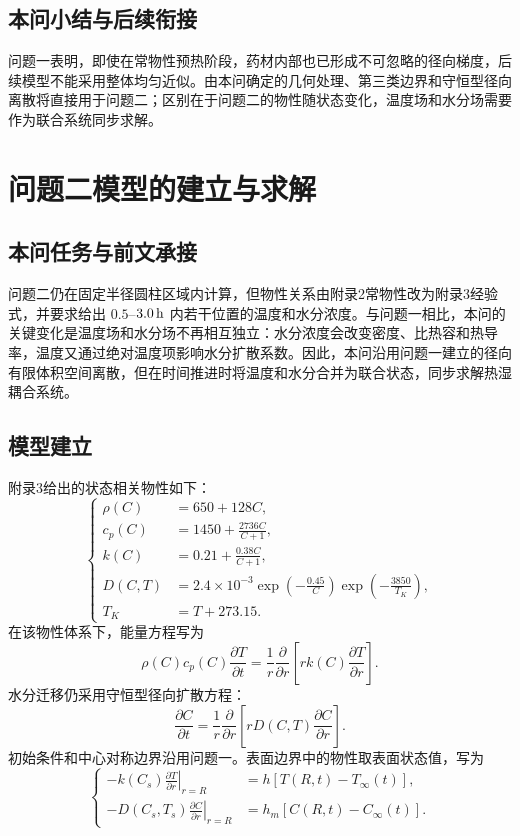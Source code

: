 \documentclass[UTF8,a4paper,12pt]{ctexart}
\begin{document}
\subsection{本问小结与后续衔接}
问题一表明，即使在常物性预热阶段，药材内部也已形成不可忽略的径向梯度，后续模型不能采用整体均匀近似。由本问确定的几何处理、第三类边界和守恒型径向离散将直接用于问题二；区别在于问题二的物性随状态变化，温度场和水分场需要作为联合系统同步求解。

\section{问题二模型的建立与求解}
\subsection{本问任务与前文承接}
问题二仍在固定半径圆柱区域内计算，但物性关系由附录2常物性改为附录3经验式，并要求给出 $0.5$--$3.0\rm\,h$ 内若干位置的温度和水分浓度。与问题一相比，本问的关键变化是温度场和水分场不再相互独立：水分浓度会改变密度、比热容和热导率，温度又通过绝对温度项影响水分扩散系数。因此，本问沿用问题一建立的径向有限体积空间离散，但在时间推进时将温度和水分合并为联合状态，同步求解热湿耦合系统。

\subsection{模型建立}
附录3给出的状态相关物性如下：
\begin{equation}
\left\{
\begin{aligned}
\rho(C)&=650+128C,\\
c_p(C)&=1450+\frac{2736C}{C+1},\\
k(C)&=0.21+\frac{0.38C}{C+1},\\
D(C,T)&=2.4\times10^{-3}
\exp\left(-\frac{0.45}{C}\right)
\exp\left(-\frac{3850}{T_K}\right),\\
T_K&=T+273.15.
\end{aligned}
\right.
\end{equation}
\setcounter{equation}{18}
在该物性体系下，能量方程写为
\begin{equation}
  \rho(C)c_p(C)\frac{\partial T}{\partial t}
  =\frac1r\frac{\partial}{\partial r}
  \left[rk(C)\frac{\partial T}{\partial r}\right].
\end{equation}
水分迁移仍采用守恒型径向扩散方程：
\begin{equation}
  \frac{\partial C}{\partial t}
  =\frac1r\frac{\partial}{\partial r}
  \left[rD(C,T)\frac{\partial C}{\partial r}\right].
\end{equation}
初始条件和中心对称边界沿用问题一。表面边界中的物性取表面状态值，写为
\begin{equation}
\left\{
\begin{aligned}
-k(C_s)\left.\frac{\partial T}{\partial r}\right|_{r=R}
&=h\left[T(R,t)-T_\infty(t)\right],\\
-D(C_s,T_s)\left.\frac{\partial C}{\partial r}\right|_{r=R}
&=h_m\left[C(R,t)-C_\infty(t)\right].
\end{aligned}
\right.
\end{equation}
\setcounter{equation}{22}
\end{document}
